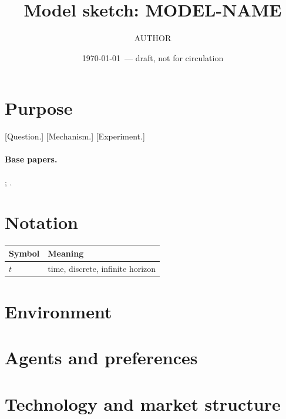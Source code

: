 \documentclass[12pt]{article}
\title{Model sketch: MODEL-NAME}
\author{AUTHOR}
\date{\today\ --- draft, not for circulation}
\theoremstyle{remark}
\begin{document}
\maketitle

\section*{Purpose}
[Question.] [Mechanism.] [Experiment.]

\paragraph{Base papers.} \citet{KEY1}; \citet{KEY2}.

\section*{Notation}
\begin{center}
\begin{tabular}{ll}
\toprule
Symbol & Meaning \\
\midrule
$t$ & time, discrete, infinite horizon \\
\bottomrule
\end{tabular}
\end{center}

\section{Environment}

\section{Agents and preferences}

\section{Technology and market structure}
\end{document}

